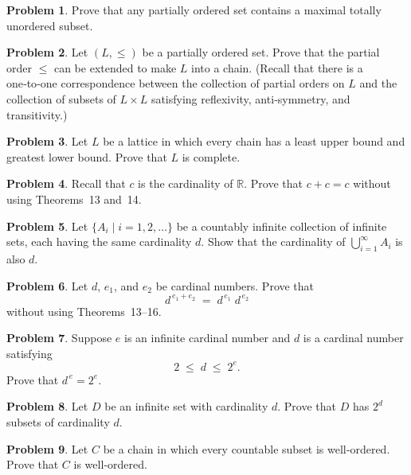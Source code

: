 \documentclass[10pt]{article}
\theoremstyle{definition} %
\newtheorem{problem}{Problem}
\theoremstyle{plain} %
\begin{document}
\begin{problem}
  Prove that any partially ordered set contains a maximal totally unordered subset.
\end{problem}

\begin{problem}
  Let $(L,\le)$ be a partially ordered set.  
  Prove that the partial order $\le$ can be extended to make $L$ into a chain.  
  (Recall that there is a one‑to‑one correspondence between the collection of partial orders on $L$ and the collection of subsets of $L \times L$ satisfying reflexivity, anti‑symmetry, and transitivity.)
\end{problem}

\begin{problem}
  Let $L$ be a lattice in which every chain has a least upper bound and greatest lower bound.  
  Prove that $L$ is complete.
\end{problem}

\begin{problem}
  Recall that $c$ is the cardinality of $\mathbb{R}$.  
  Prove that $c + c = c$ without using Theorems 13 and 14.
\end{problem}

\begin{problem}
  Let $\{A_i \mid i = 1, 2, \dots\}$ be a countably infinite collection of infinite sets, each having the same cardinality $d$.  
  Show that the cardinality of $\bigcup_{i=1}^{\infty} A_i$ is also $d$.
\end{problem}
\begin{problem}
  Let $d$, $e_{1}$, and $e_{2}$ be cardinal numbers.
  Prove that
  \[
      d^{\,e_{1}+e_{2}} \;=\; d^{\,e_{1}}\;d^{\,e_{2}}
  \]
  without using Theorems 13–16.
\end{problem}

\begin{problem}
  Suppose $e$ is an infinite cardinal number and $d$ is a cardinal number satisfying
  \[
      2 \;\le\; d \;\le\; 2^{e}.
  \]
  Prove that $d^{\,e} = 2^{e}$.
\end{problem}

\begin{problem}
  Let $D$ be an infinite set with cardinality $d$.  
  Prove that $D$ has $2^{d}$ subsets of cardinality $d$.
\end{problem}

\begin{problem}
  Let $C$ be a chain in which every countable subset is well‑ordered.  
  Prove that $C$ is well‑ordered.
\end{problem}
\end{document}
